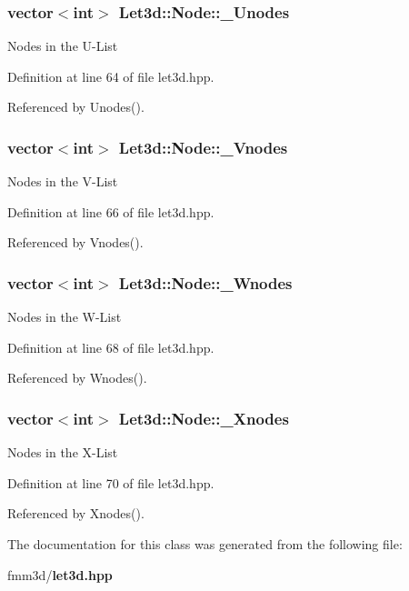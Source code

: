 \subsubsection{\setlength{\rightskip}{0pt plus 5cm}vector$<$int$>$ {\bf Let3d::Node::\_\-Unodes}\hspace{0.3cm}{\tt  [protected]}}\label{classLet3d_1_1Node_c79cd8d8d8491cc45e72786d6748e671_c79cd8d8d8491cc45e72786d6748e671}


Nodes in the U-List 

Definition at line 64 of file let3d.hpp.

Referenced by Unodes().
\subsubsection{\setlength{\rightskip}{0pt plus 5cm}vector$<$int$>$ {\bf Let3d::Node::\_\-Vnodes}\hspace{0.3cm}{\tt  [protected]}}\label{classLet3d_1_1Node_76d043428c3dde9a2fc051b3b264dfce_76d043428c3dde9a2fc051b3b264dfce}


Nodes in the V-List 

Definition at line 66 of file let3d.hpp.

Referenced by Vnodes().
\subsubsection{\setlength{\rightskip}{0pt plus 5cm}vector$<$int$>$ {\bf Let3d::Node::\_\-Wnodes}\hspace{0.3cm}{\tt  [protected]}}\label{classLet3d_1_1Node_983b9481f8e54a74dbe36f633c4a8da7_983b9481f8e54a74dbe36f633c4a8da7}


Nodes in the W-List 

Definition at line 68 of file let3d.hpp.

Referenced by Wnodes().
\subsubsection{\setlength{\rightskip}{0pt plus 5cm}vector$<$int$>$ {\bf Let3d::Node::\_\-Xnodes}\hspace{0.3cm}{\tt  [protected]}}\label{classLet3d_1_1Node_5043fab0978cb1ebf36e5be3708c1919_5043fab0978cb1ebf36e5be3708c1919}


Nodes in the X-List 

Definition at line 70 of file let3d.hpp.

Referenced by Xnodes().

The documentation for this class was generated from the following file:\begin{CompactItemize}
\item 
fmm3d/{\bf let3d.hpp}\end{CompactItemize}
